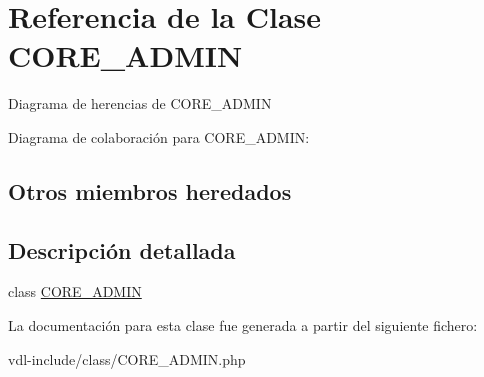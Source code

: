 \hypertarget{class_c_o_r_e___a_d_m_i_n}{\section{Referencia de la Clase C\-O\-R\-E\-\_\-\-A\-D\-M\-I\-N}
\label{class_c_o_r_e___a_d_m_i_n}
}


Diagrama de herencias de C\-O\-R\-E\-\_\-\-A\-D\-M\-I\-N


Diagrama de colaboración para C\-O\-R\-E\-\_\-\-A\-D\-M\-I\-N\-:
\subsection*{Otros miembros heredados}


\subsection{Descripción detallada}
class \hyperlink{class_c_o_r_e___a_d_m_i_n}{C\-O\-R\-E\-\_\-\-A\-D\-M\-I\-N} 

La documentación para esta clase fue generada a partir del siguiente fichero\-:\begin{DoxyCompactItemize}
\item 
vdl-\/include/class/C\-O\-R\-E\-\_\-\-A\-D\-M\-I\-N.\-php\end{DoxyCompactItemize}
